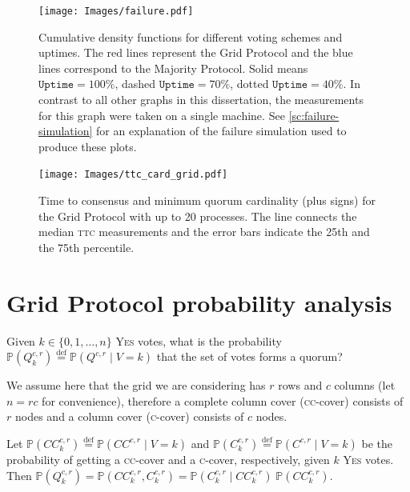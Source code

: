 \documentclass[12pt,chapterprefix=true,toc=bibliography,numbers=noendperiod,
               footnotes=multiple,twoside]{scrreprt}
\newcommand{\yes}{{\fontfamily{jkposn}\selectfont\textsc{Yes}}}
\begin{document}
    \begin{figure}[h]
        \centering
        \texttt{[image: Images/failure.pdf]}
        \caption{Cumulative density functions for different voting schemes and uptimes. The red lines represent the Grid Protocol and the blue lines correspond to the Majority Protocol. Solid means \(\texttt{Uptime} = 100\%\), dashed \(\texttt{Uptime} = 70\%\), dotted \(\texttt{Uptime} = 40\%\). In contrast to all other graphs in this dissertation, the measurements for this graph were taken on a single machine. See \cref{sc:failure-simulation} for an explanation of the failure simulation used to produce these plots.}
        \label{fig:failure-ttc}
    \end{figure}
    \begin{figure}[h]
        \centering
        \texttt{[image: Images/ttc\_card\_grid.pdf]}
        \caption{Time to consensus and minimum quorum cardinality (plus signs) for the Grid Protocol with up to 20 processes. The line connects the median \textsc{ttc} measurements and the error bars indicate the 25th and the 75th percentile.}
        \label{fig:ttc_card_grid}
    \end{figure}

\chapter{Grid Protocol probability analysis}
\label{ch:grid-p}

Given \(k \in \{0, 1, \dots, n\}\) \yes{} votes, what is the probability \(\mathbb{P}(Q^{c,r}_k) \overset{\text{def}}{=} \mathbb{P}(Q^{c,r}\;|\;V=k)\) that the set of votes forms a quorum?

We assume here that the grid we are considering has \(r\) rows and \(c\) columns (let \(n = r c\) for convenience), therefore a complete column cover (\textsc{cc}-cover) consists of \(r\) nodes and a column cover (\textsc{c}-cover) consists of \(c\) nodes.

Let \(\mathbb{P}(CC^{c,r}_k) \overset{\text{def}}{=} \mathbb{P}(CC^{c,r}\;|\;V=k)\) and \(\mathbb{P}(C^{c,r}_k) \overset{\text{def}}{=} \mathbb{P}(C^{c,r}\;|\;V=k)\) be the probability of getting a \textsc{cc}-cover and a \textsc{c}-cover, respectively, given \(k\) \yes{} votes. Then \(\mathbb{P}(Q^{c,r}_k) = \mathbb{P}(CC^{c,r}_{k}, C^{c,r}_k) = \mathbb{P}(C^{c,r}_k\;|\;CC^{c,r}_k)\;\mathbb{P}(CC^{c,r}_k)\).
\end{document}
